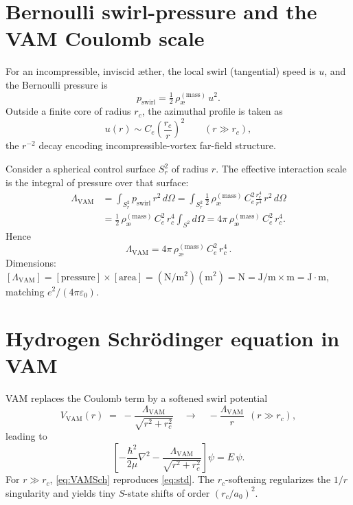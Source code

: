 \documentclass[12pt]{article}
\newcommand{\aeRhoM}{\rho_{\text{\ae}}^{(\text{mass})}}
\newcommand{\Ce}{C_e}
\newcommand{\rc}{r_c}
\newcommand{\Lam}{\Lambda_{\text{VAM}}}
\begin{document}
    \section{Bernoulli swirl-pressure and the VAM Coulomb scale}
    For an incompressible, inviscid æther, the local swirl (tangential) speed is \(u\), and the Bernoulli pressure is
    \begin{equation}
        p_{\text{swirl}} = \tfrac{1}{2}\,\aeRhoM\,u^2 .
    \end{equation}
    Outside a finite core of radius \(\rc\), the azimuthal profile is taken as
    \begin{equation}
        u(r)\sim \Ce\left(\frac{\rc}{r}\right)^2 \qquad (r\gg \rc),
    \end{equation}
    the \(r^{-2}\) decay encoding incompressible-vortex far-field structure.

    Consider a spherical control surface \(S^2_r\) of radius \(r\). The effective interaction scale is the integral of pressure over that surface:
    \begin{align}
        \Lam &= \int_{S^2_r} p_{\text{swirl}}\, r^2\,d\Omega
        = \int_{S^2_r} \frac{1}{2}\,\aeRhoM\,\Ce^2\frac{\rc^4}{r^4}\,r^2\,d\Omega \\
        &= \frac{1}{2}\,\aeRhoM\,\Ce^2\,\rc^4\int_{S^2}\! d\Omega
        = 4\pi\,\aeRhoM\,\Ce^2\,\rc^4 .
    \end{align}
    Hence
    \begin{equation}
        \boxed{\Lam = 4\pi\,\aeRhoM\,\Ce^2\,\rc^4}\,.
        \label{eq:LambdaVAM}
    \end{equation}
    Dimensions: \([\Lam]=[\text{pressure}]\times[\text{area}]=(\mathrm{N/m^2})(\mathrm{m^2})=\mathrm{N}=\mathrm{J/m}\times \mathrm{m}=\mathrm{J}\cdot\mathrm{m}\), matching \(e^2/(4\pi\varepsilon_0)\).

    \section{Hydrogen Schr\"odinger equation in VAM}
    VAM replaces the Coulomb term by a softened swirl potential
    \begin{equation}
        V_{\text{VAM}}(r)\;=\;-\frac{\Lam}{\sqrt{r^2+\rc^2}}
        \quad\to\quad -\frac{\Lam}{r}\ \ (r\gg \rc),
    \end{equation}
    leading to
    \begin{equation}
        \label{eq:VAMSch}
        \left[-\frac{\hbar^2}{2\mu}\nabla^2 - \frac{\Lam}{\sqrt{r^2+\rc^2}}\right]\psi = E\,\psi.
    \end{equation}
    For \(r\gg\rc\), \eqref{eq:VAMSch} reproduces \eqref{eq:std}. The \(\rc\)-softening regularizes the \(1/r\) singularity and yields tiny \(S\)-state shifts of order \((\rc/a_0)^2\).
\end{document}
